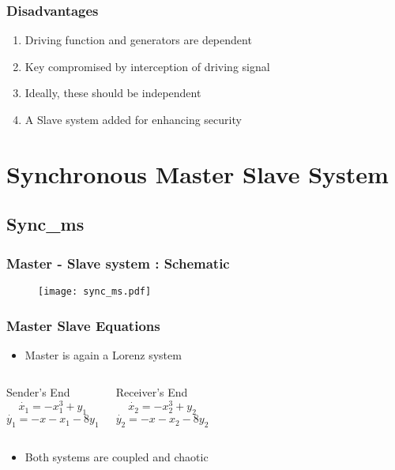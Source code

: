 \documentclass[xcolor=dvipsnames]{beamer}
\begin{document}
\begin{frame}
\frametitle{Disadvantages}
\begin{enumerate}
\item
Driving function and generators are \alert{dependent}
\newline
\item
Key compromised by interception of driving signal
\newline
\item
Ideally, these should be independent
\newline
\item
A \alert{Slave system} added for enhancing security
\newline
\end{enumerate}
\end{frame}

\section[Sync m-s]{Synchronous Master Slave System}
\subsection*{Sync_ms}
\begin{frame}
\frametitle{Master - Slave system : Schematic}
\begin{figure}
\centering
\texttt{[image: sync\_ms.pdf]}
\end{figure}
\end{frame}

\begin{frame}
\frametitle{Master Slave Equations}
\begin{itemize}
\item
Master is again a Lorenz system
\end{itemize}
\begin{columns}
\column{2in}
\begin{block}{Sender's End}
\begin{equation*}
\dot{x_1} = -x_1^3 + y_1
\end{equation*}
\begin{equation*}
\dot{y_1} = -x - x_1 - 8y_1
\end{equation*}
\end{block}
\column{2in}
\begin{block}{Receiver's End}
\begin{equation*}
\dot{x_2} = -x_2^3 + y_2
\end{equation*}
\begin{equation*}
\dot{y_2} = -x - x_2 - 8y_2
\end{equation*}
\end{block}
\end{columns}
\vspace{0.2in}
\begin{itemize}
\item
Both systems are \alert{coupled} and \alert{chaotic}
\end{itemize}
\end{frame}
\end{document}
